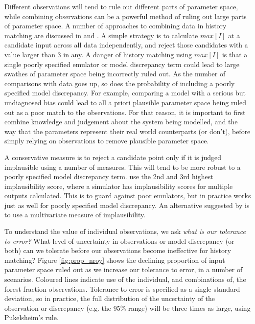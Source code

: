 \documentclass[esd, manuscript]{copernicus}
\begin{document}
Different observations will tend to rule out different parts of parameter space, while combining observations can be a powerful method of ruling out large parts of parameter space. A number of approaches to combining data in history matching are discussed in \citep{vernon2010galaxy} and \citep{williamson2013history}. A simple strategy is to calculate $max[I]$ at a candidate input across all data independently, and reject those candidates with a value larger than 3 in any. A danger of history matching using $max[I]$ is that a single poorly specified emulator or model discrepancy term could lead to large swathes of parameter space being incorrectly ruled out. As the number of comparisons with data goes up, so does the probability of including a poorly specified model discrepancy. For example, comparing a model with a serious but undiagnosed bias could lead to all a priori plausible parameter space being ruled out as a poor match to the observations. For that reason, it is important to first combine knowledge and judgement about the system being modelled, and the way that the parameters represent their real world counterparts (or don't), before simply relying on observations to remove plausible parameter space.

A conservative measure is to reject a candidate point only if it is judged implausible using a number of measures. This will tend to be more robust to a poorly specified model discrepancy term. \citep{vernon2010galaxy} use the 2nd and 3rd highest implausibility score, where a simulator has implausibility scores for multiple outputs calculated. This is to guard against poor emulators, but in practice works just as well for poorly specified model discrepancy. An alternative suggested by \citep{vernon2010galaxy} is to use a multivariate measure of implausibility.

To understand the value of individual observations, we ask \emph{what is our tolerance to error?} What level of uncertainty in observations or model discrepancy (or both) can we tolerate before our observations become ineffective for history matching? Figure \ref{fig:prop_nroy} shows the declining proportion of input parameter space ruled out as we increase our tolerance to error, in a number of scenarios. Coloured lines indicate use of the individual, and combinations of, the forest fraction observations. Tolerance to error is specified as a single standard deviation, so in practice, the full distribution of the uncertainty of the observation or discrepancy (e.g. the 95\% range) will be three times as large, using Pukelsheim's rule.
\end{document}

